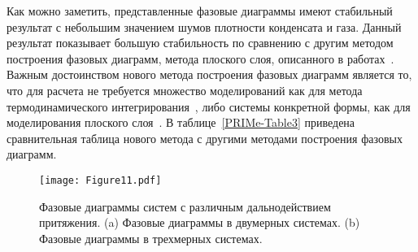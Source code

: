 Как можно заметить, представленные фазовые диаграммы имеют стабильный результат с небольшим значением шумов плотности конденсата и газа.
Данный результат показывает большую стабильность по сравнению с другим методом построения фазовых диаграмм,  метода плоского слоя, описанного в работах~\cite{10.1021/jp806127j, 10.1021/jp1117213}.
Важным достоинством нового метода построения фазовых диаграмм является то, что для расчета не требуется множество моделирований как для метода термодинамического интегрирования~\cite{10.1080/00268976.2019.1699185}, либо системы конкретной формы, как для моделирования плоского слоя~\cite{10.1021/jp806127j, 10.1021/jp1117213}.
В таблице~\ref{PRIMe-Table3} приведена сравнительная таблица нового метода с другими методами построения фазовых диаграмм.



\begin{table}[h!]
    \caption{Сравнение различных методов построения фазовых диаграмм. Под 2D и 3D понимается применимость данных методов в двумерных или трехмерных системах; под скоростью подразумевается величина затраченого времени в человеко-часах на одну точку фазовой диаграммы относительно других представленных методов; под точностью понимается точность метода относительно других представленных методов.}
    \label{PRIMe-Table3}
\end{table}



\begin{figure}[!t]
    \centering
    \texttt{[image: Figure11.pdf]}
    \caption{Фазовые диаграммы систем с различным дальнодействием притяжения.
    (a) Фазовые диаграммы в двумерных системах.
    (b) Фазовые диаграммы в трехмерных системах.}
    \label{phase_diagram}
\end{figure}

